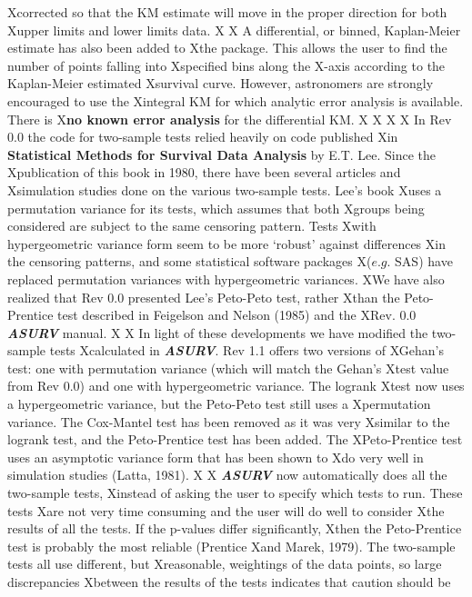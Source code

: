 Xcorrected so that the KM estimate will move in the proper direction for both
Xupper limits and lower limits data.  
X
X     A differential, or binned, Kaplan-Meier estimate has also been added to
Xthe package.  This allows the user to find the number of points falling into
Xspecified bins along the X-axis according to the Kaplan-Meier estimated
Xsurvival curve.  However, astronomers are strongly encouraged to use the
Xintegral KM for which analytic error analysis is available.  There is
X{\bf no known error analysis} for the differential KM.
X
X
X
X     In Rev 0.0 the code for two-sample tests relied heavily on code published
Xin {\bf Statistical Methods for Survival Data Analysis} by E.T. Lee.  Since the
Xpublication of this book in 1980, there have been several articles and 
Xsimulation studies done on the various two-sample tests.  Lee's book 
Xuses a permutation variance for its tests, which assumes that both 
Xgroups being considered are subject to the same censoring pattern.  Tests 
Xwith hypergeometric variance form seem to be more `robust' against differences
Xin the censoring patterns, and some statistical software packages 
X($e.g.$ SAS) have replaced permutation variances with hypergeometric variances.
XWe have also realized that Rev 0.0 presented Lee's Peto-Peto test, rather
Xthan the Peto-Prentice test described in Feigelson and Nelson (1985) and the
XRev. 0.0 {\sl\bf ASURV} manual.
X
X     In light of these developments we have modified the two-sample tests
Xcalculated in {\sl\bf ASURV}.  Rev 1.1 offers two versions of 
XGehan's test:  one with permutation variance (which will match the Gehan's 
Xtest value from Rev 0.0) and one with hypergeometric variance.  The logrank 
Xtest now uses a hypergeometric variance, but the Peto-Peto test still uses a 
Xpermutation variance.  The Cox-Mantel test has been removed as it was very
Xsimilar to the logrank test, and the Peto-Prentice test has been added.  The
XPeto-Prentice test uses an asymptotic variance form that has been shown to
Xdo very well in simulation studies (Latta, 1981).
X
X     {\sl\bf ASURV} now automatically does all the two-sample tests, 
Xinstead of asking the user to specify which tests to run.  These tests 
Xare not very time consuming and the user will do well to consider 
Xthe results of all the tests.  If the p-values differ significantly, 
Xthen the Peto-Prentice test is probably the most reliable (Prentice 
Xand Marek, 1979).  The two-sample tests all use different, but 
Xreasonable, weightings of the data points, so large discrepancies 
Xbetween the results of the tests indicates that caution should be 
